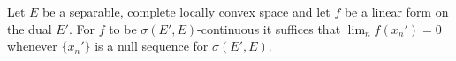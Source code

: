 Let $E$ be a separable, complete locally convex space and let $f$ be a linear form on the dual $E'$. For $f$ to be $\sigma(E', E)$-continuous it suffices that $\lim_n f(x_n') = 0$ whenever $\{x_n'\}$ is a null sequence for $\sigma(E', E)$.
